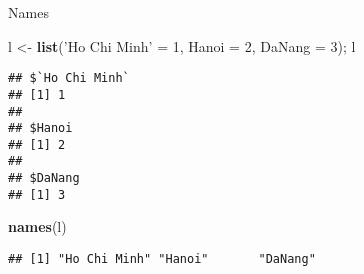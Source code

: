 \documentclass[
  ignorenonframetext,
]{beamer}
\newenvironment{Shaded}{}{}
\newcommand{\DataTypeTok}[1]{\textcolor[rgb]{0.56,0.13,0.00}{#1}}
\newcommand{\DecValTok}[1]{\textcolor[rgb]{0.25,0.63,0.44}{#1}}
\newcommand{\KeywordTok}[1]{\textcolor[rgb]{0.00,0.44,0.13}{\textbf{#1}}}
\newcommand{\NormalTok}[1]{#1}
\newcommand{\StringTok}[1]{\textcolor[rgb]{0.25,0.44,0.63}{#1}}
\begin{document}
\begin{frame}[fragile]{Names}
\protect\hypertarget{names-6}{}

\begin{Shaded}
\begin{Highlighting}[]
\NormalTok{l <-}\StringTok{ }\KeywordTok{list}\NormalTok{(}\StringTok{'Ho Chi Minh'}\NormalTok{ =}\StringTok{ }\DecValTok{1}\NormalTok{, }\DataTypeTok{Hanoi =} \DecValTok{2}\NormalTok{, }\DataTypeTok{DaNang =} \DecValTok{3}\NormalTok{); l}
\end{Highlighting}
\end{Shaded}

\begin{verbatim}
## $`Ho Chi Minh`
## [1] 1
## 
## $Hanoi
## [1] 2
## 
## $DaNang
## [1] 3
\end{verbatim}

\begin{Shaded}
\begin{Highlighting}[]
\KeywordTok{names}\NormalTok{(l)}
\end{Highlighting}
\end{Shaded}

\begin{verbatim}
## [1] "Ho Chi Minh" "Hanoi"       "DaNang"
\end{verbatim}

\end{frame}
\end{document}
